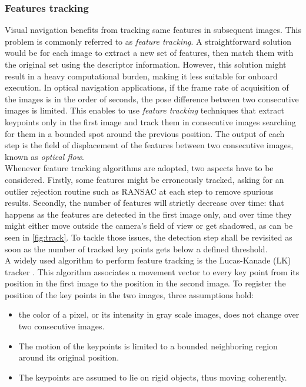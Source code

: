 \subsubsection*{Features tracking}
\label{toc:fftrack}
Visual navigation benefits from tracking same features in subsequent images. 
This problem is commonly referred to as \textit{feature tracking}. A straightforward solution would be for each image to extract a new set of features, then match them with the original set using the descriptor information. However, this solution might result in a heavy computational burden, making it less suitable for onboard execution. In optical navigation applications, if the frame rate of acquisition of the images is in the order of seconds, the pose difference between two consecutive images is limited. This enables to use \textit{feature tracking} techniques that extract keypoints only in the first image and track them in consecutive images searching for them in a bounded spot around the previous position.
The output of each step is the field of displacement of the features between two consecutive images, known as \textit{optical flow}.\\
Whenever feature tracking algorithms are adopted, 
two aspects have to be considered. Firstly, some features might be erroneously tracked, asking for an outlier rejection routine such as RANSAC at each step to remove spurious results. Secondly, the number of features will strictly decrease over time: that happens as the features are detected in the first image only, and over time they might either move outside the camera's field of view or get shadowed, as can be seen in \cref{fig:track}. To tackle those issues, the detection step shall be revisited as soon as the number of tracked key points gets below a defined threshold.\\
A widely used algorithm to perform feature tracking is the Lucas-Kanade (LK) tracker \cite{lucas1981iterative}. This algorithm associates a movement vector to every key point from its position in the first image to the position in the second image. To register the position of the key points in the two images, three assumptions hold:
\begin{itemize}
    \item the color of a pixel, or its intensity in gray scale images, does not change over two consecutive images. 
    \item The motion of the keypoints is limited to a bounded neighboring region around its original position.
    \item The keypoints are assumed to lie on rigid objects, thus moving coherently.
\end{itemize}

